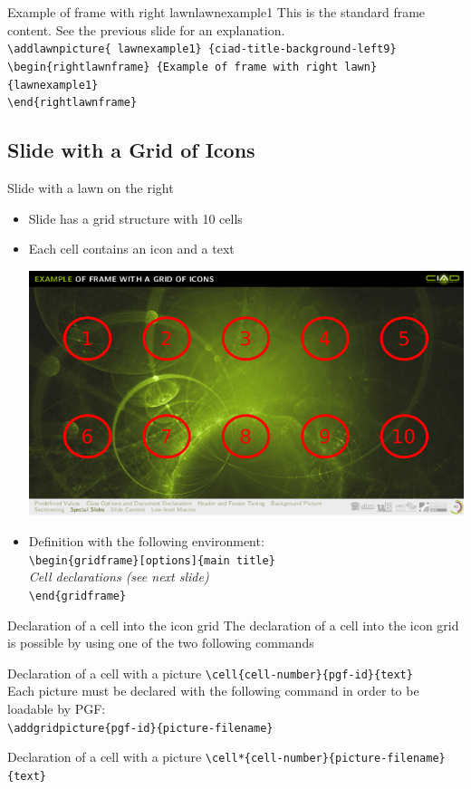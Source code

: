 \documentclass[english,sectioncirclenumberstyle]{ciadbeamer}
\begin{document}
\begin{rightlawnframe}{{Example of frame} with right lawn}{lawnexample1}
	This is the standard frame content. See the previous slide for an explanation. \\[.5cm]
	\smaller
	\texttt{{\textbackslash}addlawnpicture\{ lawnexample1\} \{ciad-title-background-left9\}} \\
	\texttt{{\textbackslash}begin\{rightlawnframe\} \{Example of frame with right lawn\}\{lawnexample1\}} \\
	\texttt{{\textbackslash}end\{rightlawnframe\}}
\end{rightlawnframe}

\subsection{Slide with a Grid of Icons}

\begin{frame}[t]{Slide with a lawn on the right}
	\begin{itemize}
		\item Slide has a grid structure with 10 cells
		\item Each cell contains an icon and a text
			\begin{center}
				\includegraphics[width=.5\linewidth]{gridframe}
			\end{center}
		\item Definition with the following environment: \\
			\texttt{{\textbackslash}begin\{gridframe\}[options]\{main title\}} \\
			\emph{Cell declarations (see next slide)} \\
			\texttt{{\textbackslash}end\{gridframe\}}
	\end{itemize}
\end{frame}

\begin{frame}{{Declaration of a cell} into the icon grid}
	The declaration of a cell into the icon grid is possible by using one of the two following commands
	\begin{block}{Declaration of a cell with a picture }
		\texttt{{\textbackslash}cell\{cell-number\}\{pgf-id\}\{text\}} \\[.25cm]
		Each picture must be declared with the following command in order to be loadable by PGF: \\
			\texttt{{\textbackslash}addgridpicture\{pgf-id\}\{picture-filename\}}
	\end{block}
	\begin{block}{Declaration of a cell with a picture }
		\texttt{{\textbackslash}cell*\{cell-number\}\{picture-filename\}\{text\}}
	\end{block}
\end{frame}
\end{document}
